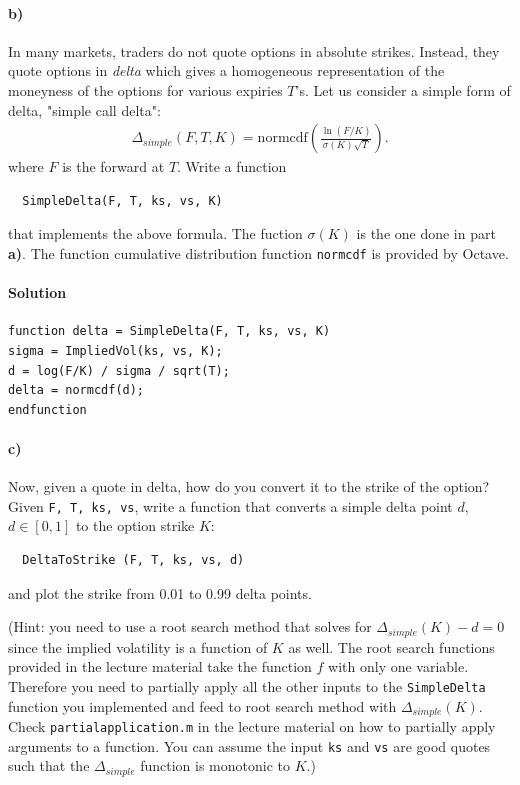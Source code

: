 \documentclass[12pt,a4paper,hidelinks,fleqn]{article}            %
\begin{document}
\paragraph{b)}
In many markets, traders do not quote options in absolute strikes. 
Instead, they quote options in \emph{delta} which gives a homogeneous representation of the moneyness of the options for various expiries $T$'s.
Let us consider a simple form of delta, "simple call delta":
\begin{align*}
\Delta_{simple} (F, T, K) = \text{normcdf}\left( \frac{\ln(F/K)}{\sigma(K) \sqrt T} \right).
\end{align*}
where $F$ is the forward at $T$. 
Write a function 
\vspace{-6mm}
\begin{verbatim}
  SimpleDelta(F, T, ks, vs, K)
\end{verbatim}
\vspace{-6mm}
that implements the above formula. The fuction $\sigma(K)$ is the one done in part \textbf{a)}. 
The function cumulative distribution function \verb=normcdf= is provided by Octave.

\paragraph{Solution}
\begin{verbatim}
function delta = SimpleDelta(F, T, ks, vs, K)
sigma = ImpliedVol(ks, vs, K);
d = log(F/K) / sigma / sqrt(T);
delta = normcdf(d);
endfunction
\end{verbatim}
 
\paragraph{c)} Now, given a quote in delta, how do you convert it to the strike of the option?
Given \verb=F, T, ks, vs=, write a function that converts a simple delta point $d$, $d \in [0, 1]$ to the option strike $K$:
\begin{verbatim}
  DeltaToStrike (F, T, ks, vs, d)
\end{verbatim}
and plot the strike from 0.01 to 0.99 delta points.

(Hint: you need to use a root search method that solves for $\Delta_{simple}(K) - d = 0$ since the implied volatility is a function of $K$ as well.
The root search functions provided in the lecture material take the function $f$ with only one variable. 
Therefore you need to partially apply all the other inputs to the \verb=SimpleDelta= function you implemented and feed to root search method with $\Delta_{simple}(K)$.
Check \verb=partialapplication.m= in the lecture material on how to partially apply arguments to a function.
You can assume the input \verb=ks= and \verb=vs= are good quotes such that the $\Delta_{simple}$ function is monotonic to $K$.)
\end{document}
